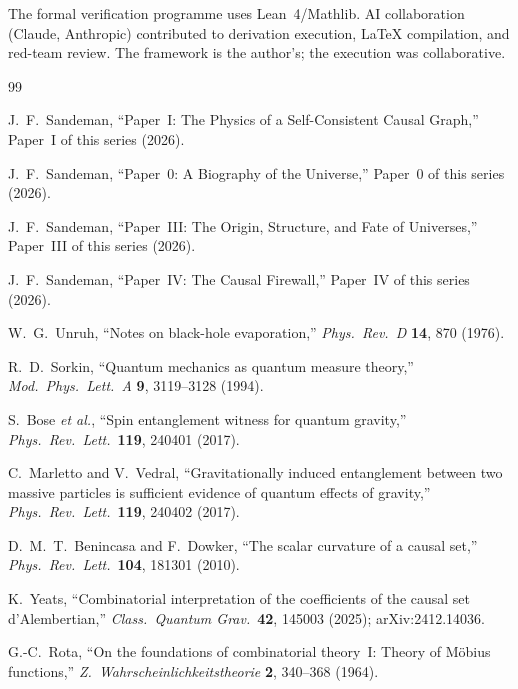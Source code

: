 \documentclass[11pt,a4paper]{article}
\theoremstyle{plain}
\theoremstyle{definition}
\theoremstyle{remark}
\begin{document}
The formal verification programme uses Lean~4/Mathlib.  AI collaboration (Claude,
Anthropic) contributed to derivation execution, LaTeX compilation, and red-team
review.  The framework is the author's; the execution was collaborative.

\begin{thebibliography}{99}

J.~F.~Sandeman,
``Paper~I: The Physics of a Self-Consistent Causal Graph,''
Paper~I of this series (2026).

J.~F.~Sandeman,
``Paper~0: A Biography of the Universe,''
Paper~0 of this series (2026).

J.~F.~Sandeman,
``Paper~III: The Origin, Structure, and Fate of Universes,''
Paper~III of this series (2026).

J.~F.~Sandeman,
``Paper~IV: The Causal Firewall,''
Paper~IV of this series (2026).

W.~G.~Unruh,
``Notes on black-hole evaporation,''
\textit{Phys.\ Rev.\ D} \textbf{14}, 870 (1976).

R.~D.~Sorkin,
``Quantum mechanics as quantum measure theory,''
\textit{Mod.\ Phys.\ Lett.\ A} \textbf{9}, 3119--3128 (1994).

S.~Bose \textit{et al.},
``Spin entanglement witness for quantum gravity,''
\textit{Phys.\ Rev.\ Lett.}\ \textbf{119}, 240401 (2017).

C.~Marletto and V.~Vedral,
``Gravitationally induced entanglement between two massive particles is sufficient
evidence of quantum effects of gravity,''
\textit{Phys.\ Rev.\ Lett.}\ \textbf{119}, 240402 (2017).

D.~M.~T.~Benincasa and F.~Dowker,
``The scalar curvature of a causal set,''
\textit{Phys.\ Rev.\ Lett.}\ \textbf{104}, 181301 (2010).

K.~Yeats,
``Combinatorial interpretation of the coefficients of the causal set
d'Alembertian,''
\textit{Class.\ Quantum Grav.}\ \textbf{42}, 145003 (2025);
arXiv:2412.14036.

G.-C.~Rota,
``On the foundations of combinatorial theory~I: Theory of M\"obius functions,''
\textit{Z.\ Wahrscheinlichkeitstheorie} \textbf{2}, 340--368 (1964).

\end{thebibliography}
\end{document}
